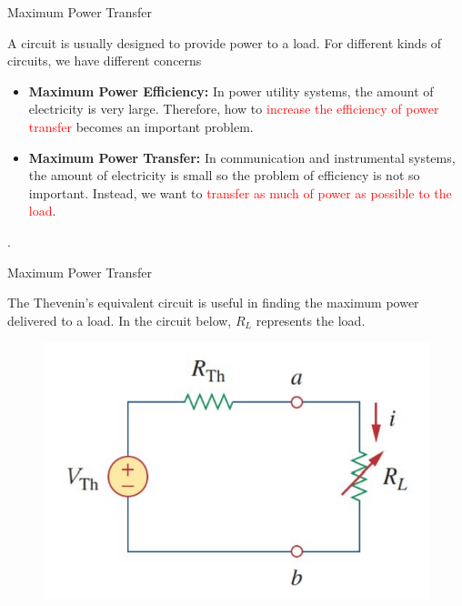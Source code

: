 \documentclass{beamer}
\begin{document}

\begin{frame}{Maximum Power Transfer}

A circuit is usually designed to provide power to a load. For different kinds of circuits, we have different concerns

\begin{itemize}
    \item \textbf{Maximum Power Efficiency:}
    In power utility systems, the amount of electricity is very large. Therefore, how to \textcolor{red}{ increase the efficiency of power transfer} becomes an important problem.
    \item \textbf{Maximum Power Transfer:}  In communication and instrumental systems, the amount of electricity is small so the problem of efficiency is not so important. Instead, we want to \textcolor{red}{transfer as much of power as possible to the load}.
\end{itemize}.


\end{frame}


\begin{frame}{Maximum Power Transfer}
 
The Thevenin’s equivalent circuit is useful in finding the maximum power delivered to a load. In the circuit below, $R_L$ represents the load.


\begin{figure}
\centering
\includegraphics[scale=0.5]{img_cir/11.png}
\end{figure}

\end{frame}
\end{document}
